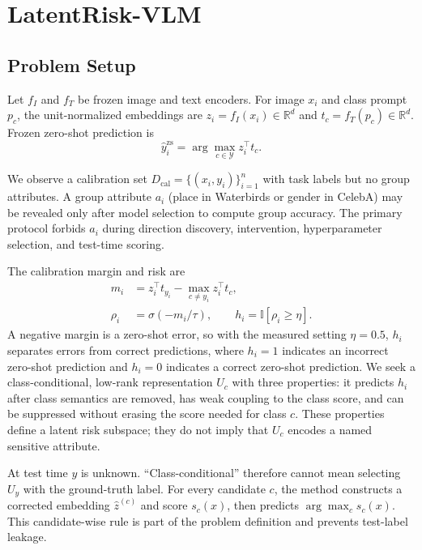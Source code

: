 \section{LatentRisk-VLM}
\subsection{Problem Setup}
Let $f_I$ and $f_T$ be frozen image and text encoders. For image $x_i$ and class prompt $p_c$, the unit-normalized embeddings are $z_i=f_I(x_i)\in\mathbb{R}^d$ and $t_c=f_T(p_c)\in\mathbb{R}^d$. Frozen zero-shot prediction is
\begin{equation}
 \hat y_i^{\mathrm{zs}}=\arg\max_{c\in\mathcal{Y}} z_i^\top t_c.
\end{equation}

We observe a calibration set $D_{\mathrm{cal}}=\{(x_i,y_i)\}_{i=1}^n$ with task labels but no group attributes. A group attribute $a_i$ (place in Waterbirds or gender in CelebA) may be revealed only after model selection to compute group accuracy. The primary protocol forbids $a_i$ during direction discovery, intervention, hyperparameter selection, and test-time scoring.

The calibration margin and risk are
\begin{align}
 m_i &= z_i^\top t_{y_i}-\max_{c\ne y_i}z_i^\top t_c,\\
 \rho_i &= \sigma(-m_i/\tau), \qquad h_i=\mathbb{I}[\rho_i\geq\eta].
\end{align}
A negative margin is a zero-shot error, so with the measured setting $\eta=0.5$, $h_i$ separates errors from correct predictions, where $h_i=1$ indicates an incorrect zero-shot prediction and $h_i=0$ indicates a correct zero-shot prediction. We seek a class-conditional, low-rank representation $U_c$ with three properties: it predicts $h_i$ after class semantics are removed, has weak coupling to the class score, and can be suppressed without erasing the score needed for class $c$. These properties define a latent risk subspace; they do not imply that $U_c$ encodes a named sensitive attribute. 


At test time $y$ is unknown. ``Class-conditional'' therefore cannot mean selecting $U_y$ with the ground-truth label. For every candidate $c$, the method constructs a corrected embedding $\hat z^{(c)}$ and score $s_c(x)$, then predicts $\arg\max_c s_c(x)$. This candidate-wise rule is part of the problem definition and prevents test-label leakage.

